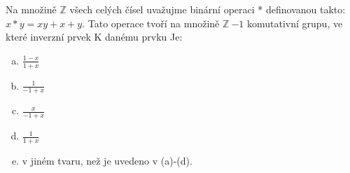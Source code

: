 Na množině $\mathbb{Z}$ všech celých čísel uvažujme binární operaci *
definovanou takto: $x*y=xy + x + y$. Tato operace tvoří na množině $\mathbb{Z} \
{-1}$ komutativní grupu, ve které inverzní prvek K danému prvku Je:

\begin{enumerate}[a)]
  \item $\frac{1-x}{1+x}$
  \item $\frac{1}{-1+x}$
  \item $\frac{x}{-1+x}$
  \item $\frac{1}{1+x}$
  \item v jiném tvaru, než je uvedeno v (a)-(d).
\end{enumerate}
